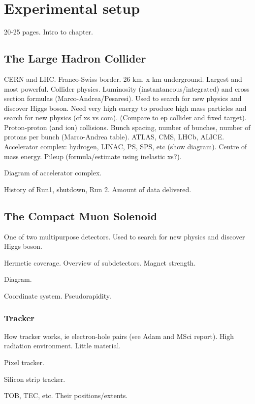 \chapter{Experimental setup}
\label{chap:detector}

20-25 pages.
Intro to chapter.

\section{The Large Hadron Collider}

CERN and LHC. Franco-Swiss border. 26 km. x km underground. Largest and most 
powerful.
Collider physics. Luminosity (instantaneous/integrated) and cross 
section formulas (Marco-Andrea/Pesaresi).
Used to search for new physics and discover Higgs boson.
Need very high energy to produce high mass particles and search for new physics 
(cf xs vs com).
(Compare to ep collider and fixed target).
Proton-proton (and ion) collisions.
Bunch spacing, number of bunches, number of protons per bunch (Marco-Andrea 
table).
ATLAS, CMS, LHCb, ALICE.
Accelerator complex: hydrogen, LINAC, PS, SPS, etc (show diagram).
Centre of mass energy. Pileup (formula/estimate using inelastic xs?). 

Diagram of accelerator complex.

History of Run1, shutdown, Run 2. Amount of data delivered.

\section{The Compact Muon Solenoid}

One of two multipurpose detectors. Used to search for new physics and discover 
Higgs boson.

Hermetic coverage. Overview of subdetectors. Magnet strength.

Diagram.

Coordinate system. Pseudorapidity.

\subsection{Tracker}

How tracker works, ie electron-hole pairs (see Adam and MSci report).
High radiation environment. Little material.

Pixel tracker.

Silicon strip tracker.

TOB, TEC, etc. Their positions/extents.

